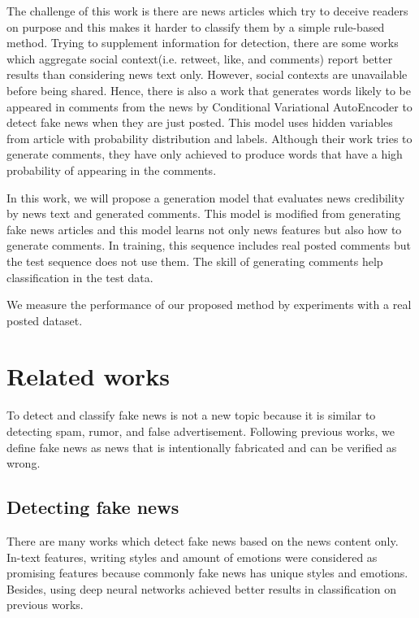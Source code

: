 \documentclass[conference]{IEEEtran}
\begin{document}
The challenge of this work is there are news articles which try to deceive readers on purpose
and this makes it harder to classify them by a simple rule-based method.
Trying to supplement information for detection,
there are some works which aggregate social context(i.e. retweet, like, and comments)
report better results than considering news text only\cite{Guo:2018:RDH:3269206.3271709}.
However, social contexts are unavailable before being shared.
Hence, there is also a work that generates words likely to be appeared in comments from the news by Conditional Variational AutoEncoder to detect fake news when they are just posted\cite{ijcai2018-533}.
This model uses hidden variables from article with probability distribution and labels.
Although their work tries to generate comments, they have only achieved to produce words that have a high probability of appearing in the comments.

In this work, we will propose a generation model that evaluates news credibility by news text and generated comments.
This model is modified from generating fake news articles\cite{NIPS2019_9106} and this model learns not only news features but also how to generate comments.
In training, this sequence includes real posted comments but the test sequence does not use them.
The skill of generating comments help classification in the test data.

We measure the performance of our proposed method by experiments with a real posted dataset.

\section{Related works}
To detect and classify fake news is not a new topic because it is similar to detecting spam\cite{shen2017discovering}, rumor\cite{7023340}, and false advertisement\cite{Huang:2017:DFO:3041021.3054233}.
Following previous works\cite{Shu:2017:FND:3137597.3137600,Ruchansky:2017:CHD:3132847.3132877,Wang:2018:EEA:3219819.3219903},
we define fake news as news that is intentionally fabricated and can be verified as wrong.

\subsection{Detecting fake news}
There are many works which detect fake news based on the news content only.
In-text features, writing styles\cite{DBLP:journals/corr/PotthastKRBS17} and amount of emotions\cite{DBLP:journals/corr/abs-1903-01728}
were considered as promising features because commonly fake news has unique styles and emotions.
Besides, using deep neural networks achieved better results in classification on previous works\cite{wang-2017-liar,karimi-tang-2019-learning,karimi-etal-2018-multi}.
\end{document}

